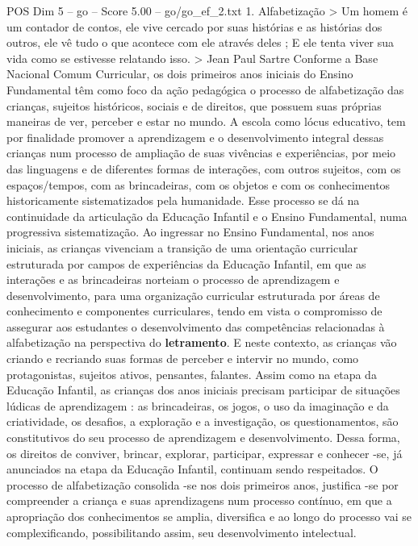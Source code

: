 \begin{textsample}{POS Dim 5 – go – Score 5.00 – go/go\_ef\_2.txt}  \label{ex:f5_pos_016}
1.
Alfabetização > Um homem é um contador de contos, ele vive cercado por suas histórias e as histórias dos outros, ele vê tudo o que acontece com ele através deles ; E ele tenta viver sua vida como se estivesse relatando isso. > Jean Paul Sartre Conforme a Base Nacional Comum Curricular, os dois primeiros anos iniciais do Ensino Fundamental têm como foco da ação pedagógica o processo de alfabetização das crianças, sujeitos históricos, sociais e de direitos, que possuem suas próprias maneiras de ver, perceber e estar no mundo.
A escola como lócus educativo, tem por finalidade promover a aprendizagem e o desenvolvimento integral dessas crianças num processo de ampliação de suas vivências e experiências, por meio das linguagens e de diferentes formas de interações, com outros sujeitos, com os espaços/tempos, com as brincadeiras, com os objetos e com os conhecimentos historicamente sistematizados pela humanidade.
Esse processo se dá na continuidade da articulação da Educação Infantil e o Ensino Fundamental, numa progressiva sistematização.
Ao ingressar no Ensino Fundamental, nos anos iniciais, as crianças vivenciam a transição de uma orientação curricular estruturada por campos de experiências da Educação Infantil, em que as interações e as brincadeiras norteiam o processo de aprendizagem e desenvolvimento, para uma organização curricular estruturada por áreas de conhecimento e componentes curriculares, tendo em vista o compromisso de assegurar aos estudantes o desenvolvimento das competências relacionadas à alfabetização na perspectiva do \textbf{letramento}.
E neste contexto, as crianças vão criando e recriando suas formas de perceber e intervir no mundo, como protagonistas, sujeitos ativos, pensantes, falantes.
Assim como na etapa da Educação Infantil, as crianças dos anos iniciais precisam participar de situações lúdicas de aprendizagem : as brincadeiras, os jogos, o uso da imaginação e da criatividade, os desafios, a exploração e a investigação, os questionamentos, são constitutivos do seu processo de aprendizagem e desenvolvimento.
Dessa forma, os direitos de conviver, brincar, explorar, participar, expressar e conhecer -se, já anunciados na etapa da Educação Infantil, continuam sendo respeitados.
O processo de alfabetização consolida -se nos dois primeiros anos, justifica -se por compreender a criança e suas aprendizagens num processo contínuo, em que a apropriação dos conhecimentos se amplia, diversifica e ao longo do processo vai se complexificando, possibilitando assim, seu desenvolvimento intelectual.

\end{textsample}
